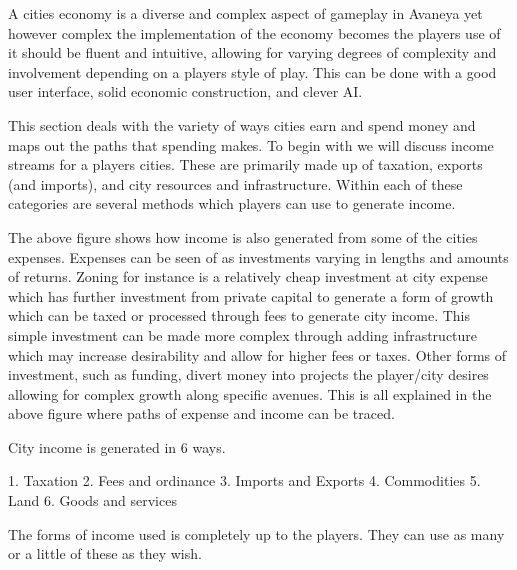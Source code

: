 


A cities economy is a diverse and complex aspect of gameplay in Avaneya yet however complex the implementation of the economy becomes the players use of it should be fluent and intuitive, allowing for varying degrees of complexity and involvement depending on a players style of play. This can be done with a good user interface, solid economic construction, and clever AI. 

This section deals with the variety of ways cities earn and spend money and maps out the paths that spending makes. To begin with we will discuss income streams for a players cities. These are primarily made up of taxation, exports (and imports), and city resources and infrastructure. Within each of these categories are several methods which players can use to generate income.


The above figure shows how income is also generated from some of the cities expenses. Expenses can be seen of as investments varying in lengths and 
amounts of returns. Zoning for instance is a relatively cheap investment at city expense which has further investment from private capital to generate a form of growth which can be taxed or processed through fees to generate city income. This simple investment can be made more complex through adding infrastructure which may increase desirability and allow for higher fees or taxes. Other forms of investment, such as funding, divert money into projects the player/city desires allowing for complex growth along specific avenues. This is all explained in the above figure where paths of expense and income can be traced.





City income is generated in 6 ways.

1.  Taxation
2.  Fees and ordinance
3.  Imports and Exports
4.  Commodities
5.  Land
6.  Goods and services

The forms of income used is completely up to the players. They can use as many or a little of these as they wish.




